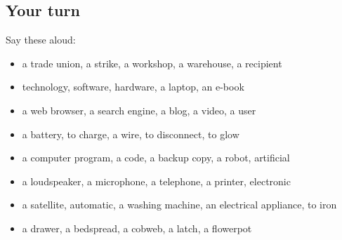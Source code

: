 \subsection*{Your turn}
Say these aloud:

\begin{itemize}
\raggedright
  \item a trade union, a strike, a workshop, a warehouse, a recipient
  \item technology, software, hardware, a laptop, an e-book
  \item a web browser, a search engine, a blog, a video, a user
  \item a battery, to charge, a wire, to disconnect, to glow
  \item a computer program, a code, a backup copy, a robot, artificial
  \item a loudspeaker, a microphone, a telephone, a printer, electronic
  \item a satellite, automatic, a washing machine, an electrical appliance, to iron
  \item a drawer, a bedspread, a cobweb, a latch, a flowerpot
\end{itemize}

